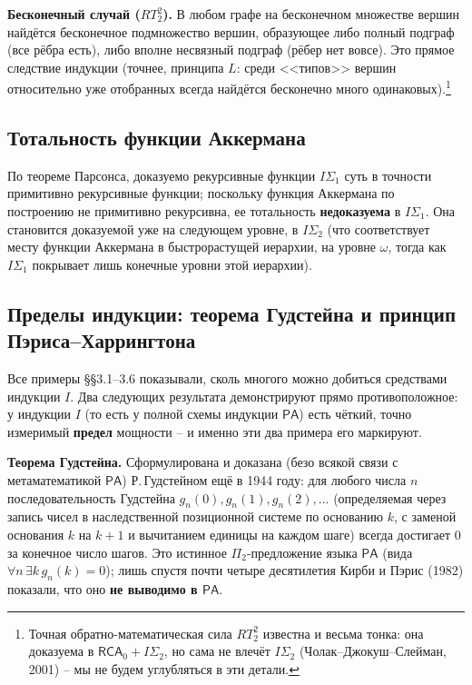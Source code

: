 \documentclass[12pt,a4paper]{article}
\theoremstyle{plain}
\theoremstyle{definition}
\newcommand{\PA}{\textsf{PA}}
\begin{document}
\textbf{Бесконечный случай ($RT^2_2$).} В любом графе на бесконечном множестве вершин найдётся бесконечное подмножество вершин, образующее либо полный подграф (все рёбра есть), либо вполне несвязный подграф (рёбер нет вовсе). Это прямое следствие индукции (точнее, принципа $L$: среди <<типов>> вершин относительно уже отобранных всегда найдётся бесконечно много одинаковых).\footnote{Точная обратно-математическая сила $RT^2_2$ известна и весьма тонка: она доказуема в $\textsf{RCA}_0+I\Sigma_2$, но сама не влечёт $I\Sigma_2$ (Чолак--Джокуш--Слейман, 2001) -- мы не будем углубляться в эти детали.}

\subsection{Тотальность функции Аккермана}
По теореме Парсонса, доказуемо рекурсивные функции $I\Sigma_1$ суть в точности примитивно рекурсивные функции; поскольку функция Аккермана по построению не примитивно рекурсивна, ее тотальность \textbf{недоказуема} в $I\Sigma_1$. Она становится доказуемой уже на следующем уровне, в $I\Sigma_2$ (что соответствует месту функции Аккермана в быстрорастущей иерархии, на уровне $\omega$, тогда как $I\Sigma_1$ покрывает лишь конечные уровни этой иерархии).

\subsection{Пределы индукции: теорема Гудстейна и принцип Пэриса--Харрингтона}
Все примеры §§3.1--3.6 показывали, сколь многого можно добиться средствами индукции $I$. Два следующих результата демонстрируют прямо противоположное: у индукции $I$ (то есть у полной схемы индукции $\PA$) есть чёткий, точно измеримый \textbf{предел} мощности -- и именно эти два примера его маркируют.

\textbf{Теорема Гудстейна.} Сформулирована и доказана (безо всякой связи с метаматематикой $\PA$) Р.\,Гудстейном ещё в 1944 году: для любого числа $n$ последовательность Гудстейна $g_n(0), g_n(1), g_n(2),\ldots$ (определяемая через запись чисел в наследственной позиционной системе по основанию $k$, с заменой основания $k$ на $k{+}1$ и вычитанием единицы на каждом шаге) всегда достигает $0$ за конечное число шагов. Это истинное $\Pi_2$-предложение языка $\PA$ (вида $\forall n\,\exists k\,g_n(k)=0$); лишь спустя почти четыре десятилетия Кирби и Пэрис (1982) показали, что оно \textbf{не выводимо в $\PA$}.
\end{document}
